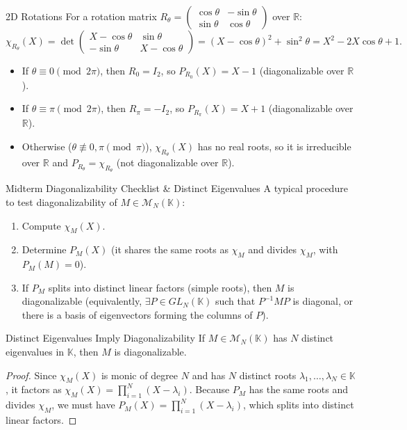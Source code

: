 \documentclass[11pt, a4paper]{article}
\newcommand{\R}{\mathbb{R}}
\begin{document}
\begin{example}{2D Rotations}{}
For a rotation matrix $R_\theta = \begin{pmatrix} \cos\theta & -\sin\theta \\ \sin\theta & \cos\theta \end{pmatrix}$ over $\R$:
$$ \chi_{R_\theta}(X) = \det\begin{pmatrix} X - \cos\theta & \sin\theta \\ -\sin\theta & X - \cos\theta \end{pmatrix} = (X - \cos\theta)^2 + \sin^2\theta = X^2 - 2X\cos\theta + 1. $$
\begin{itemize}
    \item If $\theta \equiv 0 \pmod{2\pi}$, then $R_0 = I_2$, so $P_{R_0}(X) = X - 1$ (diagonalizable over $\R$).
    \item If $\theta \equiv \pi \pmod{2\pi}$, then $R_\pi = -I_2$, so $P_{R_\pi}(X) = X + 1$ (diagonalizable over $\R$).
    \item Otherwise ($\theta \not\equiv 0, \pi \pmod{\pi}$), $\chi_{R_\theta}(X)$ has no real roots, so it is irreducible over $\R$ and $P_{R_\theta} = \chi_{R_\theta}$ (not diagonalizable over $\R$).
\end{itemize}
\end{example}

\begin{remark}{Midterm Diagonalizability Checklist \& Distinct Eigenvalues}{}
A typical procedure to test diagonalizability of $M \in \mathcal{M}_N(\mathbb{K})$:
\begin{enumerate}
    \item Compute $\chi_M(X)$.
    \item Determine $P_M(X)$ (it shares the same roots as $\chi_M$ and divides $\chi_M$, with $P_M(M) = 0$).
    \item If $P_M$ splits into distinct linear factors (simple roots), then $M$ is diagonalizable (equivalently, $\exists P \in GL_N(\mathbb{K})$ such that $P^{-1}MP$ is diagonal, or there is a basis of eigenvectors forming the columns of $P$).
\end{enumerate}
\end{remark}

\begin{proposition}{Distinct Eigenvalues Imply Diagonalizability}{}
If $M \in \mathcal{M}_N(\mathbb{K})$ has $N$ distinct eigenvalues in $\mathbb{K}$, then $M$ is diagonalizable.
\end{proposition}
\begin{proof}
Since $\chi_M(X)$ is monic of degree $N$ and has $N$ distinct roots $\lambda_1, \dots, \lambda_N \in \mathbb{K}$, it factors as $\chi_M(X) = \prod_{i=1}^N (X - \lambda_i)$. Because $P_M$ has the same roots and divides $\chi_M$, we must have $P_M(X) = \prod_{i=1}^N (X - \lambda_i)$, which splits into distinct linear factors.
\end{proof}
\end{document}

